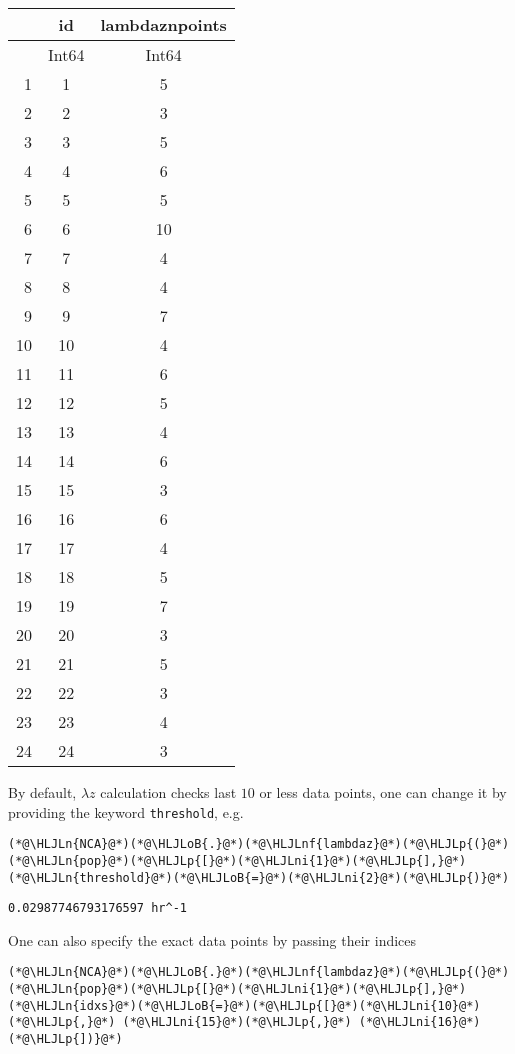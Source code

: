 \documentclass[12pt,a4paper]{article}
\newcommand{\HLJLn}[1]{#1}
\newcommand{\HLJLnf}[1]{\textcolor[RGB]{66,102,213}{#1}}
\newcommand{\HLJLni}[1]{\textcolor[RGB]{59,151,46}{#1}}
\newcommand{\HLJLoB}[1]{\textcolor[RGB]{102,102,102}{\textbf{#1}}}
\newcommand{\HLJLp}[1]{#1}
\begin{document}
\begin{tabular}{r|cc}
	& id & lambdaznpoints\\
	\hline
	& Int64 & Int64\\
	\hline
	1 & 1 & 5 \\
	2 & 2 & 3 \\
	3 & 3 & 5 \\
	4 & 4 & 6 \\
	5 & 5 & 5 \\
	6 & 6 & 10 \\
	7 & 7 & 4 \\
	8 & 8 & 4 \\
	9 & 9 & 7 \\
	10 & 10 & 4 \\
	11 & 11 & 6 \\
	12 & 12 & 5 \\
	13 & 13 & 4 \\
	14 & 14 & 6 \\
	15 & 15 & 3 \\
	16 & 16 & 6 \\
	17 & 17 & 4 \\
	18 & 18 & 5 \\
	19 & 19 & 7 \\
	20 & 20 & 3 \\
	21 & 21 & 5 \\
	22 & 22 & 3 \\
	23 & 23 & 4 \\
	24 & 24 & 3 \\
\end{tabular}


By default, $\lambda z$ calculation checks last $10$ or less data points, one can change it by providing the keyword \texttt{threshold}, e.g.


\begin{lstlisting}
(*@\HLJLn{NCA}@*)(*@\HLJLoB{.}@*)(*@\HLJLnf{lambdaz}@*)(*@\HLJLp{(}@*)(*@\HLJLn{pop}@*)(*@\HLJLp{[}@*)(*@\HLJLni{1}@*)(*@\HLJLp{],}@*) (*@\HLJLn{threshold}@*)(*@\HLJLoB{=}@*)(*@\HLJLni{2}@*)(*@\HLJLp{)}@*)
\end{lstlisting}

\begin{lstlisting}
0.02987746793176597 hr^-1
\end{lstlisting}


One can also specify the exact data points by passing their indices


\begin{lstlisting}
(*@\HLJLn{NCA}@*)(*@\HLJLoB{.}@*)(*@\HLJLnf{lambdaz}@*)(*@\HLJLp{(}@*)(*@\HLJLn{pop}@*)(*@\HLJLp{[}@*)(*@\HLJLni{1}@*)(*@\HLJLp{],}@*) (*@\HLJLn{idxs}@*)(*@\HLJLoB{=}@*)(*@\HLJLp{[}@*)(*@\HLJLni{10}@*)(*@\HLJLp{,}@*) (*@\HLJLni{15}@*)(*@\HLJLp{,}@*) (*@\HLJLni{16}@*)(*@\HLJLp{])}@*)
\end{lstlisting}
\end{document}
